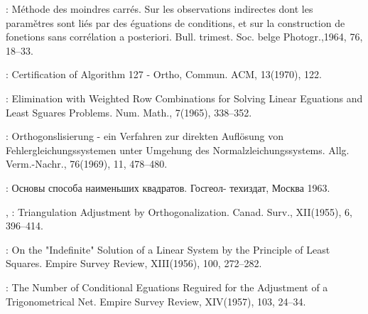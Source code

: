 
{}
\begin{enumerate}[label={[\arabic*]}]

\item {}:  Méthode des moindres carrés.  Sur
  les observations indirectes dont les paramětres sont liés par des
  éguations de conditions, et sur la construction de fonetions sans
  corrélation a posteriori. Bull. trimest. Soc. belge Photogr.,1964,
  76, 18--33.

%
\item {}: Certification of Algorithm 127 -
  Ortho, Commun.  ACM, 13(1970), 122.

\item {}: Elimination with Weighted Row Combinations
  for Solving Linear Eguations and Least Sguares Problems. Num.
  Math., 7(1965), 338--352.

\item {}: Orthogonslisierung - ein Verfahren zur direkten
  Auflösung von Fehlergleichungssystemen unter Umgehung des
  Normalzleichungssystems. Allg. Verm.-Nachr., 76(1969), 11, 478--480.

\item {}: Основы способа наименьших
квадратов. Госгеол- техиздат, Москва 1963.

\item {}, : Triangulation Adjustment by
  Orthogonalization. Canad. Surv., XII(1955), 6, 396--414.

\item {}: On the "Indefinite" Solution of a Linear
  System by the Principle of Least Squares. Empire Survey Review,
  XIII(1956), 100, 272--282.

\item {}: The Number of Conditional Eguations Reguired
  for the Adjustment of a Trigonometrical Net. Empire Survey Review,
  XIV(1957), 103, 24--34.


\end{enumerate}
